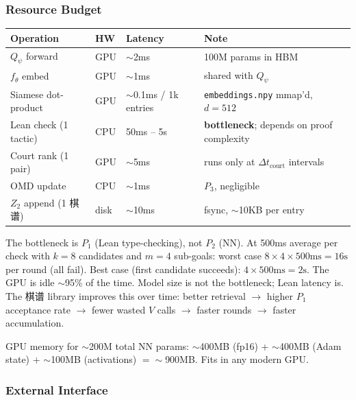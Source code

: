 \documentclass[11pt,a4paper]{article}
\theoremstyle{definition}
\theoremstyle{remark}
\begin{document}
\subsubsection*{Resource Budget}

\begin{center}
\small
\begin{tabularx}{\textwidth}{l l l X}
\toprule
\textbf{Operation} & \textbf{HW} & \textbf{Latency} & \textbf{Note} \\
\midrule
$Q_\psi$ forward & GPU & $\sim$2ms & 100M params in HBM \\
$f_\theta$ embed & GPU & $\sim$1ms & shared with $Q_\psi$ \\
Siamese dot-product & GPU & $\sim$0.1ms / 1k entries & \texttt{embeddings.npy} mmap'd, $d{=}512$ \\
Lean check (1 tactic) & CPU & 50ms -- 5s & \textbf{bottleneck}; depends on proof complexity \\
Court rank (1 pair) & GPU & $\sim$5ms & runs only at $\Delta t_{\mathrm{court}}$ intervals \\
OMD update & CPU & $\sim$1ms & $P_3$, negligible \\
$Z_2$ append (1 棋谱) & disk & $\sim$10ms & fsync, $\sim$10KB per entry \\
\bottomrule
\end{tabularx}
\end{center}

The bottleneck is $P_1$ (Lean type-checking), not $P_2$ (NN). At 500ms average per check with $k{=}8$ candidates and $m{=}4$ sub-goals: worst case $8 \times 4 \times 500\text{ms} = 16\text{s}$ per round (all fail). Best case (first candidate succeeds): $4 \times 500\text{ms} = 2\text{s}$. The GPU is idle $\sim$95\% of the time. Model size is not the bottleneck; Lean latency is. The 棋谱 library improves this over time: better retrieval $\to$ higher $P_1$ acceptance rate $\to$ fewer wasted $V$ calls $\to$ faster rounds $\to$ faster accumulation.

GPU memory for $\sim$200M total NN params: $\sim$400MB (fp16) + $\sim$400MB (Adam state) + $\sim$100MB (activations) $= \sim$900MB. Fits in any modern GPU.


\subsubsection*{External Interface}
\end{document}
